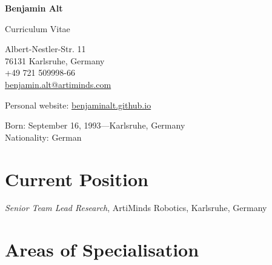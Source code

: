 \documentclass[11pt]{article} %
\begin{document}

{\LARGE\bfseries Benjamin Alt}

\bigskip

Curriculum Vitae

\bigskip\medskip %

\begin{minipage}{.5\textwidth}
Albert-Nestler-Str. 11\\
76131 Karlsruhe, Germany\\
+49 721 509998-66\\
\href{mailto:benjamin.alt@artiminds.com}{benjamin.alt@artiminds.com}
\end{minipage}%

\medskip %

Personal website: \href{https://benjaminalt.github.io}{benjaminalt.github.io} %

\medskip %

Born: September 16, 1993---Karlsruhe, Germany\\ %
Nationality: German %


\section*{Current Position}

\emph{Senior Team Lead Research}, ArtiMinds Robotics, Karlsruhe, Germany %


\section*{Areas of Specialisation}
\end{document}
